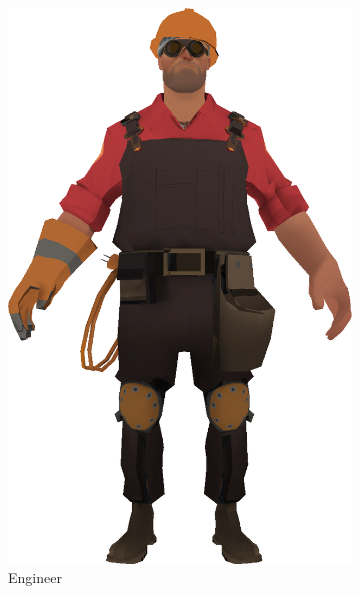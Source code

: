 \begin{figure}[h]
    \centering
        \begin{subfigure}[b]{0.14\textwidth}
        \includegraphics[width=\textwidth]{img/textures/Original.png}
        \caption{Engineer}
        \label{fig:Original}
    \end{subfigure}
    ~
    \centering
    \begin{subfigure}[b]{0.14\textwidth}

\end{subfigure}
\end{figure}
